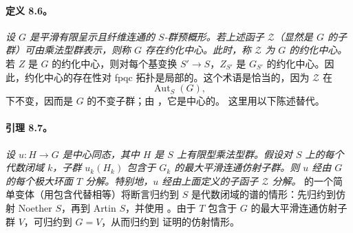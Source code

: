 \paragraph{\textbf{定义 8.6。}}
\emph{设 \(G\) 是平滑有限呈示且纤维连通的 \(S\)-群预概形。若上述函子 \(\mathcal Z\)（显然是 \(G\) 的子群）可由乘法型群表示，则称 \(G\) 存在\emph{约化中心}。此时，称 \(\mathcal Z\) 为 \(G\) 的约化中心。}
若 \(Z\) 是 \(G\) 的约化中心，则对每个基变换 \(S'\to S\)，\(Z_{S'}\) 是 \(G_{S'}\) 的约化中心。因此，约化中心的存在性对 fpqc 拓扑是局部的。这个术语是恰当的，因为 \(\mathcal Z\) 在
\[
  \operatorname{Aut}_S(G),
\]
下不变，因而是 \(G\) 的不变子群；由 ，它是中心的。
这里用以下陈述替代。
\paragraph{\textbf{引理 8.7。}}
\emph{设 \(u:H\to G\) 是中心同态，其中 \(H\) 是 \(S\) 上有限型乘法型群。假设对 \(S\) 上的每个代数闭域 \(k\)，子群 \(u_k(H_k)\) 包含于 \(G_k\) 的最大平滑连通仿射子群。则 \(u\) 经由 \(G\) 的每个极大环面 \(T\) 分解。特别地，\(u\) 经由上面定义的子函子 \(\mathcal Z\) 分解。}
 的一个简单变体（用包含代替相等）将断言归约到 \(S\) 是代数闭域的谱的情形：先归约到仿射 Noether \(S\)，再到 Artin \(S\)，并使用 。由于 \(T\) 包含于 \(G\) 的最大平滑连通仿射子群 \(V\)，可归约到 \(G=V\)，从而归约到  证明的仿射情形。
